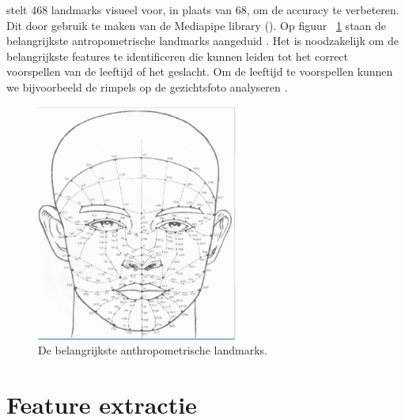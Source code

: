 \textcite{Sanil2023} stelt 468 landmarks visueel voor, in plaats van 68, om de accuracy te verbeteren. Dit door gebruik te maken van de Mediapipe library (\textcite{Zubair2021}). Op figuur {~\ref{fig:landmarks}} staan de belangrijkste antropometrische landmarks aangeduid . Het is noodzakelijk om de belangrijkste features te identificeren die kunnen leiden tot het correct voorspellen van de leeftijd of het geslacht. Om de leeftijd te voorspellen kunnen we bijvoorbeeld de rimpels op de gezichtsfoto analyseren \autocite{Kwon1994}. 
\begin{figure}
    \centering
    \includegraphics{graphics/faciallandmarks.png}
    \caption[Belangrijkste anthropometrische landmarks]{\label{fig:landmarks}De belangrijkste anthropometrische landmarks\autocite{Sanil2023}.}
\end{figure}

\section{Feature extractie} \label{sec:featextractie}
